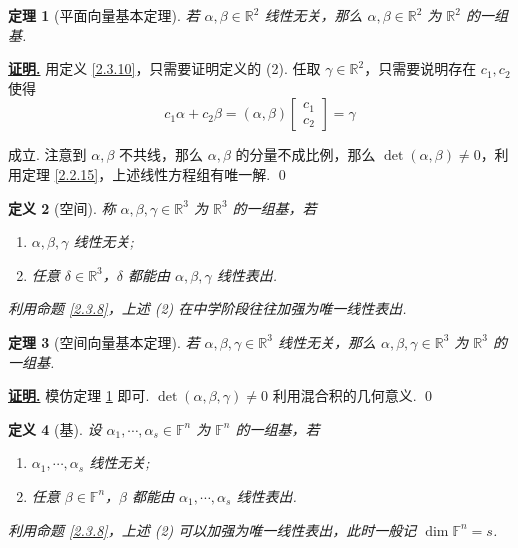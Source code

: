 \documentclass[10pt,openany]{article}
\theoremstyle{thmstyle} %
\newtheorem{theorem}{定理}[subsection]
\theoremstyle{defstyle} %
\newtheorem{definition}[theorem]{定义}
\theoremstyle{prostyle} %
\theoremstyle{exastyle}
\theoremstyle{remstyle}
\renewenvironment{proof}[1][证明]{\par\underline{\textbf{#1.}} \;\fangsong}{\qed\par}
\newcommand{\F}{\mathbb{F}}
\newcommand{\R}{\mathbb{R}}
\begin{document}
\begin{theorem}[平面向量基本定理] \label{2.3.11}
	若 \( \alpha,\beta \in \R^2 \) 线性无关，那么 \( \alpha, \beta \in \R^2 \) 为 \( \R^2 \) 的一组基.
\end{theorem}

\begin{proof}
	用定义 \ref{2.3.10}，只需要证明定义的 (2). 任取 \( \gamma \in \R^2 \)，只需要说明存在 \( c_1,c_2 \) 使得
	\[ c_1\alpha+c_2\beta=(\alpha,\beta)\begin{bmatrix}
		c_1 \\ c_2
	\end{bmatrix}= \gamma \]
	
	成立. 注意到 \( \alpha,\beta \) 不共线，那么 \( \alpha,\beta \) 的分量不成比例，那么 \( \det(\alpha,\beta) \neq 0 \)，利用定理 \ref{2.2.15}，上述线性方程组有唯一解.
\end{proof}

\begin{definition}[空间] \label{2.3.12}
	称 \( \alpha, \beta, \gamma \in \R^3 \) 为 \( \R^3 \) 的一组基，若
	\begin{enumerate}[(1)]
		\item \( \alpha,\beta,\gamma \) 线性无关;
		\item 任意 \( \delta \in \R^3 \)，\( \delta \) 都能由 \( \alpha,\beta,\gamma \) 线性表出.
	\end{enumerate}
	利用命题 \ref{2.3.8}，上述 (2) 在中学阶段往往加强为唯一线性表出.
\end{definition}

\begin{theorem}[空间向量基本定理] \label{2.3.13}
	若 \( \alpha,\beta,\gamma \in \R^3 \) 线性无关，那么 \( \alpha, \beta,\gamma \in \R^3 \) 为 \( \R^3 \) 的一组基.
\end{theorem}

\begin{proof}
	模仿定理 \ref{2.3.11} 即可. \( \det(\alpha,\beta,\gamma) \neq 0 \) 利用混合积的几何意义.
\end{proof}

\begin{definition}[基] \label{2.3.14}
	设 \( \alpha_1,\cdots,\alpha_s \in \F^n \) 为 \( \F^n \) 的一组基，若
	\begin{enumerate}[(1)]
		\item \( \alpha_1,\cdots,\alpha_s \) 线性无关;
		\item 任意 \( \beta \in \F^n \)，\( \beta \) 都能由 \( \alpha_1,\cdots,\alpha_s \) 线性表出.
	\end{enumerate}
	利用命题 \ref{2.3.8}，上述 (2) 可以加强为唯一线性表出，此时一般记 \( \dim \F^n=s \).
\end{definition}
\end{document}
